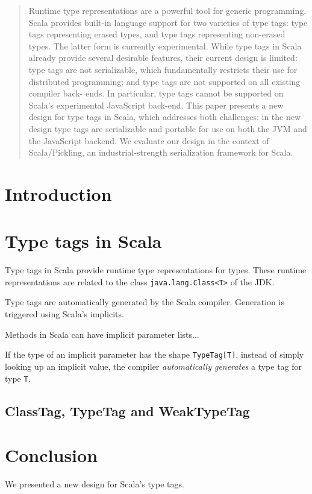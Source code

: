\documentclass[runningheads]{llncs}
\begin{document}
\begin{sloppypar}
\begin{abstract}

Runtime type representations are a powerful tool for generic programming.
Scala provides built-in language support for two varieties of type tags: type
tags representing erased types, and type tags representing non-erased types.
The latter form is currently experimental. While type tags in Scala already
provide several desirable features, their current design is limited: type tags
are not serializable, which fundamentally restricts their use for distributed
programming; and type tags are not supported on all existing compiler back-
ends. In particular, type tags cannot be supported on Scala's experimental
JavaScript back-end. This paper presents a new design for type tags in Scala,
which addresses both challenges: in the new design type tags are serializable
and portable for use on both the JVM and the JavaScript backend. We evaluate
our design in the context of Scala/Pickling, an industrial-strength
serialization framework for Scala.



\end{abstract}
%
\vspace{-3mm}
\section{Introduction}

\section{Type tags in Scala}

Type tags in Scala provide runtime type representations for types. These
runtime representations are related to the class \verb|java.lang.Class<T>| of
the JDK.

Type tags are automatically generated by the Scala compiler. Generation is
triggered using Scala's implicits.

Methods in Scala can have implicit parameter lists...

If the type of an implicit parameter has the shape \verb|TypeTag[T]|, instead
of simply looking up an implicit value, the compiler {\em automatically
generates} a type tag for type \verb|T|.


\subsection{ClassTag, TypeTag and WeakTypeTag}

\section{Conclusion}
\label{sec:conclusion}
\vspace{-1mm}

We presented a new design for Scala's type tags.




\end{sloppypar}
\end{document}
